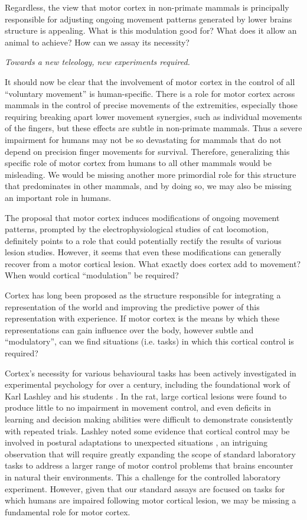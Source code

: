 Regardless, the view that motor cortex in non-primate mammals is principally responsible for adjusting ongoing movement patterns generated by lower brains structure is appealing. What is this modulation good for? What does it allow an animal to achieve? How can we assay its necessity?


\emph{Towards a new teleology, new experiments required.}

It should now be clear that the involvement of motor cortex in the control of all ``voluntary movement'' is human-specific. There is a role for motor cortex across mammals in the control of precise movements of the extremities, especially those requiring breaking apart lower movement synergies, such as individual movements of the fingers, but these effects are subtle in non-primate mammals. Thus a severe impairment for humans may not be so devastating for mammals that do not depend on precision finger movements for survival. Therefore, generalizing this specific role of motor cortex from humans to all other mammals would be misleading. We would be missing another more primordial role for this structure that predominates in other mammals, and by doing so, we may also be missing an important role in humans.

The proposal that motor cortex induces modifications of ongoing movement patterns, prompted by the electrophysiological studies of cat locomotion, definitely points to a role that could potentially rectify the results of various lesion studies. However, it seems that even these modifications can generally recover from a motor cortical lesion. What exactly does cortex add to movement? When would cortical “modulation” be required?

Cortex has long been proposed as the structure responsible for integrating a representation of the world and improving the predictive power of this representation with experience. If motor cortex is the means by which these representations can gain influence over the body, however subtle and “modulatory”, can we find situations (i.e. tasks) in which this cortical control is required? 

Cortex’s necessity for various behavioural tasks has been actively investigated in experimental psychology for over a century, including the foundational work of Karl Lashley and his students \cite{Lashley1950a}. In the rat, large cortical lesions were found to produce little to no impairment in movement control, and even deficits in learning and decision making abilities were difficult to demonstrate consistently with repeated trials. Lashley noted some evidence that cortical control may be involved in postural adaptations to unexpected situations \cite{Lashley1921a}, an intriguing observation that will require greatly expanding the scope of standard laboratory tasks to address a larger range of motor control problems that brains encounter in natural their environments. This a challenge for the controlled laboratory experiment.  However, given that our standard assays are focused on tasks for which humans are impaired following motor cortical lesion, we may be missing a fundamental role for motor cortex.

